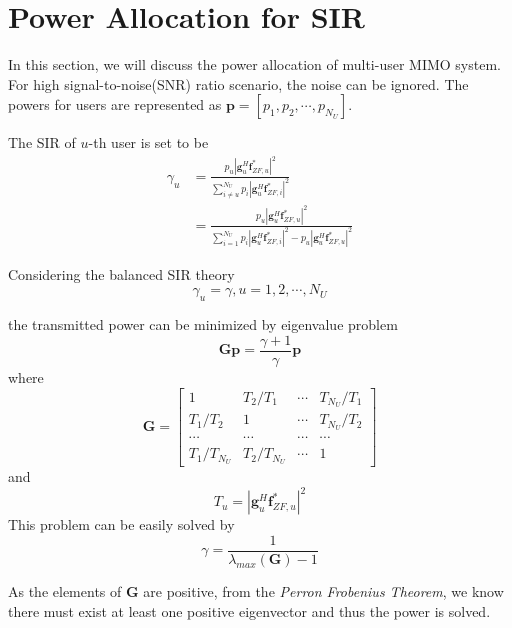 \documentclass[conference]{IEEEtran}
\begin{document}
\section{Power Allocation for SIR}
In this section, we will discuss the power allocation of multi-user MIMO system. For high signal-to-noise(SNR) ratio scenario, the noise can be ignored. The powers for users are represented as $\bm{p}=[p_1, p_2, \cdots, p_{N_U}]$. 

The SIR of $u$-th user is set to be 
\begin{align}
	\gamma_u &= \frac{p_u|\bm{g}_u^H\bm{f}^*_{ZF,u}|^2}{\sum_{i\neq u}^{N_U}p_i|\bm{g}_u^H \bm{f}^*_{ZF,i}|^2} \nonumber\\
		     &= \frac{p_u|\bm{g}_u^H\bm{f}^*_{ZF,u}|^2}{\sum_{i=1}^{N_U}p_i|\bm{g}_u^H \bm{f}^*_{ZF,i}|^2 - p_u|\bm{g}_u^H \bm{f}^*_{ZF,u}|^2}
\end{align}

Considering the balanced SIR theory 
\begin{equation}
\gamma_u=\gamma, u=1,2,\cdots,N_U
\end{equation}

the transmitted power can be minimized by eigenvalue problem
\begin{equation}
	\bm{Gp} = \frac{\gamma+1}{\gamma} \bm{p}
\end{equation}
where 
\begin{equation}
\bm{G}=
\begin{bmatrix}
1&T_2/T_1&\cdots&T_{N_U}/T_1\\
T_1/T_2&1&\cdots&T_{N_U}/T_2\\
\cdots&\cdots&\cdots&\cdots\\
T_1/T_{N_U}&T_2/T_{N_U}&\cdots&1
\end{bmatrix}
\end{equation}
and
\begin{equation}
T_u = |\bm{g}_u^H \bm{f}^*_{ZF,u}|^2
\end{equation}
This problem can be easily solved by 
\begin{equation}
	\gamma = \frac{1}{\lambda_{max}(\bm{G})-1}
\end{equation}

As the elements of $\bm{G}$ are positive, from the \textit{Perron Frobenius Theorem}, we know there must exist at least one positive eigenvector and thus the power is solved.







\end{document}

